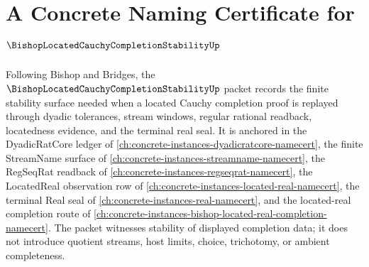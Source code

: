 \chapter{A Concrete Naming Certificate for $\BishopLocatedCauchyCompletionStabilityUp$}
\label{ch:concrete-instances-bishop-located-cauchy-completion-stability-namecert}

Following Bishop and Bridges, the $\BishopLocatedCauchyCompletionStabilityUp$ packet records the finite stability surface needed when a located Cauchy completion proof is replayed through dyadic tolerances, stream windows, regular rational readback, locatedness evidence, and the terminal real seal. It is anchored in the DyadicRatCore ledger of \autoref{ch:concrete-instances-dyadicratcore-namecert}, the finite StreamName surface of \autoref{ch:concrete-instances-streamname-namecert}, the RegSeqRat readback of \autoref{ch:concrete-instances-regseqrat-namecert}, the LocatedReal observation row of \autoref{ch:concrete-instances-located-real-namecert}, the terminal Real seal of \autoref{ch:concrete-instances-real-namecert}, and the located-real completion route of \autoref{ch:concrete-instances-bishop-located-real-completion-namecert}. The packet witnesses stability of displayed completion data; it does not introduce quotient streams, host limits, choice, trichotomy, or ambient completeness.

